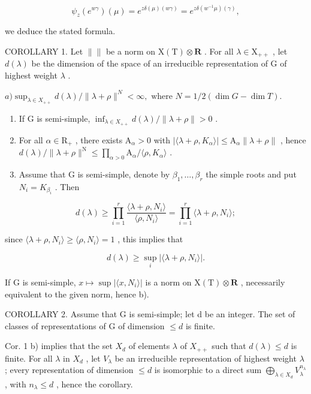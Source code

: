 \[
\psi_ {z} (e ^ {w \gamma}) (\mu) = e ^ {z \delta (\mu) (w \gamma)} = e ^ {z \delta (w ^ {- 1} \mu) (\gamma)},
\]

we deduce the stated formula.

COROLLARY 1. Let \(\| \|\) be a norm on \(\mathrm{X(T)}\otimes \mathbf{R}\) . For all \(\lambda \in \mathrm{X}_{++}\) , let \(d(\lambda)\) be the dimension of the space of an irreducible representation of \(\mathrm{G}\) of highest weight \(\lambda\) .

\(a) \sup_{\lambda \in X_{++}} d(\lambda) / \| \lambda + \rho \|^{N} < \infty, \text{ where } N = 1/2 (\dim G - \dim T).\)

\begin{enumerate}
\def\labelenumi{\alph{enumi})}
\setcounter{enumi}{1}
\item
  If G is semi-simple, \(\inf_{\lambda\in X_{++}}d(\lambda)/\|\lambda+\rho\|>0\) .
\item
  For all \(\alpha \in \mathrm{R}_{+}\) , there exists \(\mathrm{A}_{\alpha} > 0\) with \(|\langle \lambda + \rho, K_{\alpha} \rangle| \leq \mathrm{A}_{\alpha} \| \lambda + \rho \|\) , hence \(d(\lambda) / \| \lambda + \rho \|^{\mathrm{N}} \leq \prod_{\alpha > 0} \mathrm{A}_{\alpha} / \langle \rho, K_{\alpha} \rangle\) .
\item
  Assume that G is semi-simple, denote by \(\beta_{1},\ldots,\beta_{r}\) the simple roots and put \(N_{i}=K_{\beta_{i}}\) . Then
\end{enumerate}

\[
d (\lambda) \geq \prod_ {i = 1} ^ {r} \frac {\langle \lambda + \rho , N _ {i} \rangle}{\langle \rho , N _ {i} \rangle} = \prod_ {i = 1} ^ {r} \langle \lambda + \rho , N _ {i} \rangle ;
\]

since \(\langle \lambda +\rho ,N_i\rangle \geq \langle \rho ,N_i\rangle = 1\) , this implies that

\[
d (\lambda) \geq \sup _ {i} | \langle \lambda + \rho , N _ {i} \rangle |.
\]

If G is semi-simple, \(x \mapsto \sup |\langle x, N_{i} \rangle|\) is a norm on \(\mathrm{X(T)} \otimes \mathbf{R}\) , necessarily equivalent to the given norm, hence b).

COROLLARY 2. Assume that G is semi-simple; let d be an integer. The set of classes of representations of G of dimension \(\leq d\) is finite.

Cor. 1 b) implies that the set \(X_{d}\) of elements \(\lambda\) of \(X_{++}\) such that \(d(\lambda) \leq d\) is finite. For all \(\lambda\) in \(X_{d}\) , let \(V_{\lambda}\) be an irreducible representation of highest weight \(\lambda\) ; every representation of dimension \(\leq d\) is isomorphic to a direct sum \(\bigoplus_{\lambda \in X_{d}} V_{\lambda}^{n_{\lambda}}\) , with \(n_{\lambda} \leq d\) , hence the corollary.

